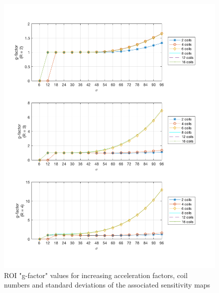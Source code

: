 \begin{figure}[H]
    \centering
    \includegraphics[width=1\textwidth,keepaspectratio]{2gfactor}
    \caption{ROI "g-factor" values for increasing acceleration factors, coil numbers and standard deviations of the associated sensitivity maps}
    \label{fig:2gfactor}
\end{figure} 

